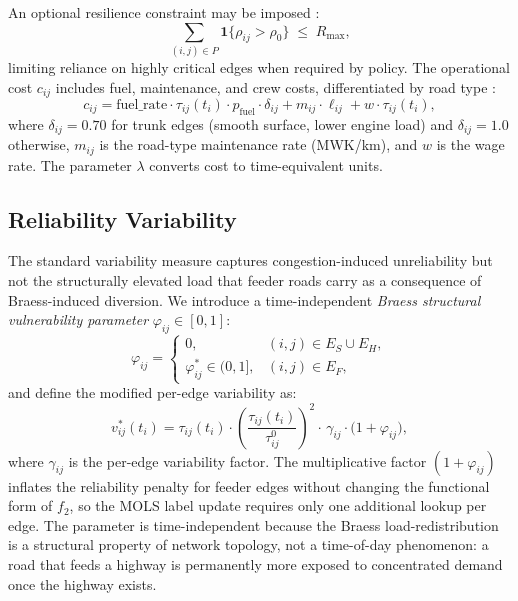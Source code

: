 \documentclass[paper=A4, 12pt, mathscr]{report}
\begin{document}
	An optional resilience constraint may be imposed \cite{6}:
	\begin{equation}
		\sum_{(i,j)\in P}\mathbf{1}\bigl\{\rho_{ij}>\rho_0\bigr\}
		\;\le\; R_{\max},
		\label{eq:res_constraint}
	\end{equation}
	limiting reliance on highly critical edges when required by policy. The
	operational cost $c_{ij}$ includes fuel, maintenance, and crew costs,
	differentiated by road type \cite{tirkolaee2020,ding2021}:
	\[
	c_{ij} = \mathrm{fuel\_rate}\cdot\tau_{ij}(t_i)\cdot p_{\mathrm{fuel}}
	\cdot\delta_{ij}
	+ m_{ij}\cdot\ell_{ij}
	+ w\cdot\tau_{ij}(t_i),
	\]
	where $\delta_{ij}=0.70$ for trunk edges (smooth surface, lower engine
	load) and $\delta_{ij}=1.0$ otherwise, $m_{ij}$ is the road-type
	maintenance rate (MWK/km), and $w$ is the wage rate. The parameter
	$\lambda$ converts cost to time-equivalent units.
	
	\subsection*{Reliability Variability}
	
	The standard variability measure \cite{16} captures congestion-induced
	unreliability but not the structurally elevated load that feeder roads
	carry as a consequence of Braess-induced diversion. We introduce a
	time-independent \textit{Braess structural vulnerability parameter}
	$\varphi_{ij}\in[0,1]$:
	\begin{equation}
		\varphi_{ij} =
		\begin{cases}
			0, & (i,j)\in E_S\cup E_H, \\[4pt]
			\varphi_{ij}^{*}\in(0,1], & (i,j)\in E_F,
		\end{cases}
		\label{eq:phi}
	\end{equation}
	and define the modified per-edge variability as:
	\begin{equation}
		v^*_{ij}(t_i)
		= \tau_{ij}(t_i)
		\cdot\!\left(\frac{\tau_{ij}(t_i)}{\tau_{ij}^0}\right)^{\!2}
		\cdot\,\gamma_{ij}
		\cdot\bigl(1+\varphi_{ij}\bigr),
		\label{eq:vstar}
	\end{equation}
	where $\gamma_{ij}$ is the per-edge variability factor. The multiplicative
	factor $(1+\varphi_{ij})$ inflates the reliability penalty for feeder
	edges without changing the functional form of $f_2$, so the MOLS label
	update requires only one additional lookup per edge. The parameter is
	time-independent because the Braess load-redistribution is a structural
	property of network topology, not a time-of-day phenomenon: a road that
	feeds a highway is permanently more exposed to concentrated demand once
	the highway exists.
	
\end{document}
